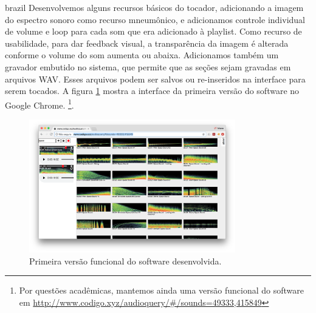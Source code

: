 \begin{otherlanguage*}{brazil}
 Desenvolvemos alguns recursos básicos do tocador, adicionando a imagem do espectro sonoro como recurso mneumônico, e adicionamos controle individual de volume e loop para cada som que era adicionado à playlist. Como recurso de usabilidade, para dar feedback visual, a transparência da imagem é alterada conforme o volume do som aumenta ou abaixa. Adicionamos também um gravador embutido no sistema, que permite que as seções sejam gravadas em arquivos WAV. Esses arquivos podem ser salvos ou re-inseridos na interface para serem tocados. A figura \ref{fig:audioquery} mostra a interface da primeira versão do software no Google Chrome. \footnote{Por questões acadêmicas, mantemos ainda uma versão funcional do software em \url{http://www.codigo.xyz/audioquery/#/sounds=49333,415849}}.

\begin{figure}
\centering
\includegraphics[width=0.8\textwidth]{pictures/cap4/audioquery}
\caption{\label{pstimeline}Primeira versão funcional do software desenvolvida.}
\label{fig:audioquery}
\end{figure}





\end{otherlanguage*}


